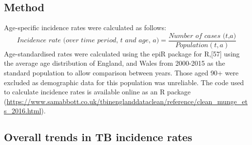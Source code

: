 \documentclass[11pt,twoside]{bristolthesis}
\begin{document}
  \hypertarget{method-1}{%
  \subsection{Method}\label{method-1}}
  
  Age-specific incidence rates were calculated as follows:
  \begin{equation} 
    \textit{Incidence rate (over time period, t and age, a)} = \frac{\textit{Number of cases (t,a)}}{Population(t, a)}
    \label{eq:incEq}
  \end{equation}
  Age-standardised rates were calculated using the epiR package for R,{[}57{]} using the average age distribution of England, and Wales from 2000-2015 as the standard population to allow comparison between years. Those aged 90+ were excluded as demographic data for this population was unreliable. The code used to calculate incidence rates is available online as an R package (\url{https://www.samabbott.co.uk/tbinenglanddataclean/reference/clean_munge_ets_2016.html}).
  
  \hypertarget{overall-trends-in-tb-incidence-rates}{%
  \subsection{Overall trends in TB incidence rates}\label{overall-trends-in-tb-incidence-rates}}
  
\end{document}
